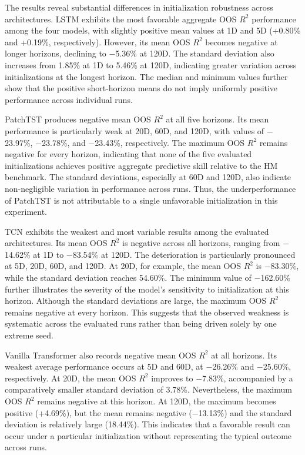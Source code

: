 \documentclass[12pt,twoside]{ord}
\begin{document}
The results reveal substantial differences in initialization robustness across architectures. LSTM exhibits the most favorable aggregate OOS $R^2$ performance among the four models, with slightly positive mean values at 1D and 5D (+0.80\% and +0.19\%, respectively). However, its mean OOS $R^2$ becomes negative at longer horizons, declining to $-$5.36\% at 120D. The standard deviation also increases from 1.85\% at 1D to 5.46\% at 120D, indicating greater variation across initializations at the longest horizon. The median and minimum values further show that the positive short-horizon means do not imply uniformly positive performance across individual runs.

PatchTST produces negative mean OOS $R^2$ at all five horizons. Its mean performance is particularly weak at 20D, 60D, and 120D, with values of $-$23.97\%, $-$23.78\%, and $-$23.43\%, respectively. The maximum OOS $R^2$ remains negative for every horizon, indicating that none of the five evaluated initializations achieves positive aggregate predictive skill relative to the HM benchmark. The standard deviations, especially at 60D and 120D, also indicate non-negligible variation in performance across runs. Thus, the underperformance of PatchTST is not attributable to a single unfavorable initialization in this experiment.

TCN exhibits the weakest and most variable results among the evaluated architectures. Its mean OOS $R^2$ is negative across all horizons, ranging from $-$14.62\% at 1D to $-$83.54\% at 120D. The deterioration is particularly pronounced at 5D, 20D, 60D, and 120D. At 20D, for example, the mean OOS $R^2$ is $-$83.30\%, while the standard deviation reaches 54.60\%. The minimum value of $-$162.60\% further illustrates the severity of the model's sensitivity to initialization at this horizon. Although the standard deviations are large, the maximum OOS $R^2$ remains negative at every horizon. This suggests that the observed weakness is systematic across the evaluated runs rather than being driven solely by one extreme seed.

Vanilla Transformer also records negative mean OOS $R^2$ at all horizons. Its weakest average performance occurs at 5D and 60D, at $-$26.26\% and $-$25.60\%, respectively. At 20D, the mean OOS $R^2$ improves to $-$7.83\%, accompanied by a comparatively smaller standard deviation of 3.78\%. Nevertheless, the maximum OOS $R^2$ remains negative at this horizon. At 120D, the maximum becomes positive (+4.69\%), but the mean remains negative ($-$13.13\%) and the standard deviation is relatively large (18.44\%). This indicates that a favorable result can occur under a particular initialization without representing the typical outcome across runs.
\end{document}
